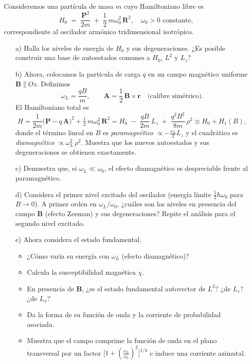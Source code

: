 \documentclass[a4paper,11pt]{article}
\begin{document}
Consideremos una partícula de masa \(m\) cuyo Hamiltoniano libre es
\[
  H_0 \;=\; \frac{\mathbf{P}^2}{2m} \;+\; \frac{1}{2}\,m\omega_0^2\,\mathbf{R}^2,
  \quad \omega_0>0\text{ constante},
\]
correspondiente al oscilador armónico tridimensional isotrópico.

\begin{enumerate}
  \item[a)] Halla los niveles de energía de \(H_0\) y sus degeneraciones. ¿Es posible construir una base de autoestados comunes a \(H_0\), \(L^2\) y \(L_z\)?
  
  \item[b)] Ahora, colocamos la partícula de carga \(q\) en un campo magnético uniforme \(\mathbf B\parallel Oz\). Definimos
  \[
    \omega_L = \frac{qB}{m},
    \qquad
    \mathbf A = \frac{1}{2}\,\mathbf B\times\mathbf r
    \quad\text{(calibre simétrico)}.
  \]
  El Hamiltoniano total es
  \[
    H = \frac{1}{2m}\bigl(\mathbf P - q\,\mathbf A\bigr)^2
        + \tfrac12\,m\omega_0^2\,\mathbf R^2
      = H_0 \;-\;\frac{qB}{2m}\,L_z
        \;+\;\frac{q^2B^2}{8m}\,\rho^2
      \equiv H_0 + H_1(B),
  \]
  donde el término lineal en \(B\) es \emph{paramagnético}
  \(\propto -\tfrac{\omega_L}{2}L_z\) y el cuadrático es \emph{diamagnético}
  \(\propto \omega_L^2\,\rho^2\).  
  Muestra que los nuevos autoestados y sus degeneraciones se obtienen exactamente.
  
  \item[c)] Demuestra que, si \(\omega_L\ll \omega_0\), el efecto diamagnético es
  despreciable frente al paramagnético.

  \item[d)] Considera el primer nivel excitado del oscilador (energía límite
  \(\tfrac{5}{2}\hbar\omega_0\) para \(B\to0\)). A primer orden en
  \(\omega_L/\omega_0\), ¿cuáles son los niveles en presencia del campo
  \(\mathbf B\) (efecto Zeeman) y sus degeneraciones? Repite el análisis
  para el segundo nivel excitado.

  \item[e)] Ahora considera el estado fundamental.  
  \begin{itemize}
    \item ¿Cómo varía su energía con \(\omega_L\) (efecto diamagnético)?
    \item Calcula la susceptibilidad magnética \(\chi\).
    \item En presencia de \(\mathbf B\), ¿es el estado fundamental autovector de \(L^2\)? ¿de \(L_z\)? ¿de \(L_x\)?
    \item Da la forma de su función de onda y la corriente de probabilidad asociada.
    \item Muestra que el campo comprime la función de onda en el plano transversal
    por un factor \(\bigl[1+(\tfrac{\omega_L}{\omega_0})^2\bigr]^{1/4}\)
    e induce una corriente azimutal.
  \end{itemize}
\end{enumerate}
\end{document}
